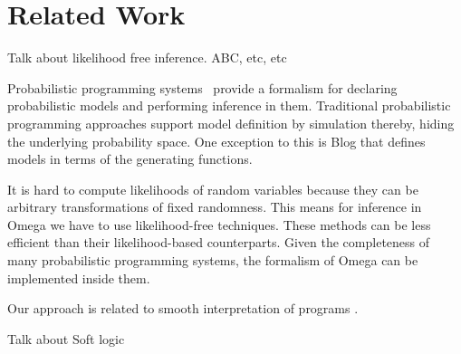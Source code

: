 \section{Related Work}
Talk about likelihood free inference.
ABC, etc, etc 

Probabilistic programming systems~\citep{milch20071, wood2014new,mansinghka2014venture,goodman2008church,carpenter2017stan} provide a formalism
for declaring probabilistic models and performing inference
in them. Traditional probabilistic programming approaches support model definition by simulation thereby, hiding the underlying probability space. 
One exception to this is Blog \citep{milch20071} 
that defines models in terms of the generating functions.

It is hard to compute likelihoods of random variables because they can be arbitrary transformations of fixed randomness. This means for inference in Omega we have to use likelihood-free techniques. These methods can be less efficient than their likelihood-based counterparts. Given the completeness of many probabilistic programming systems, the formalism of Omega can be implemented inside them.

Our approach is related to smooth interpretation of programs \citep{chaudhuri2010smooth}.

Talk about Soft logic